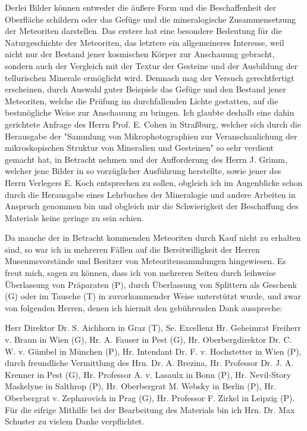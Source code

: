 \documentclass[a4paper, 11pt, oneside, polutonikogreek, german]{article}
\begin{document}
Derlei Bilder können entweder die äußere Form und die Beschaffenheit der Oberfläche schildern oder das Gefüge und die mineralogische Zusammensetzung der Meteoriten darstellen. Das erstere hat eine besondere Bedeutung für die Naturgeschichte der Meteoriten, das letztere ein allgemeineres Interesse, weil nicht nur der Bestand jener kosmischen Körper zur Anschauung gebracht, sondern auch der Vergleich mit der Textur der Gesteine und der Ausbildung der tellurischen Minerale ermöglicht wird. Demnach mag der Versuch gerechtfertigt erscheinen, durch Auswahl guter Beispiele das Gefüge und den Bestand jener Meteoriten, welche die Prüfung im durchfallenden Lichte gestatten, auf die bestmögliche Weise zur Anschauung zu bringen. Ich glaubte deshalb eine dahin gerichtete Anfrage des Herrn Prof. E. Cohen in Straßburg, welcher sich durch die Herausgabe der "Sammlung von Mikrophotographien zur Veranschaulichung der mikroskopischen Struktur von Mineralien und Gesteinen" so sehr verdient gemacht hat, in Betracht nehmen und der Aufforderung des Herrn J. Grimm, welcher jene Bilder in so vorzüglicher Ausführung herstellte, sowie jener des Herrn Verlegers E. Koch entsprechen zu sollen, obgleich ich im Augenblicke schon durch die Herausgabe eines Lehrbuches der Mineralogie und andere Arbeiten in Anspruch genommen bin und obgleich mir die Schwierigkeit der Beschaffung des Materials keine geringe zu sein schien.

Da manche der in Betracht kommenden Meteoriten durch Kauf nicht zu erhalten sind, so war ich in mehreren Fällen auf die Bereitwilligkeit der Herren Museumsvorstände und Besitzer von Meteoritensammlungen hingewiesen. Es freut mich, sagen zu können, dass ich von mehreren Seiten durch leihweise Überlassung von Präparaten (P), durch Überlassung von Splittern als Geschenk (G) oder im Tausche (T) in zuvorkommender Weise unterstützt wurde, und zwar von folgenden Herren, denen ich hiermit den gebührenden Dank ausspreche:

Herr Direktor Dr. S. Aichhorn in Graz (T), Se. Excellenz Hr. Geheimrat Freiherr v. Braun in Wien (G), Hr. A. Fauser in Pest (G), Hr. Oberbergdirektor Dr. C. W. v. Gümbel in München (P), Hr. Intendant Dr. F. v. Hochstetter in Wien (P), durch freundliche Vermittlung des Hrn. Dr. A. Brezina, Hr. Professor Dr. J. A. Krenner in Pest (G), Hr. Professor A. v. Lasaulx in Bonn (P), Hr. Nevil-Story Maskelyne in Salthrop (P), Hr. Oberbergrat M. Websky in Berlin (P), Hr. Oberbergrat v. Zepharovich in Prag (G), Hr. Professor F. Zirkel in Leipzig (P). Für die eifrige Mithilfe bei der Bearbeitung des Materials bin ich Hrn. Dr. Max Schuster zu vielem Danke verpflichtet.
\end{document}
